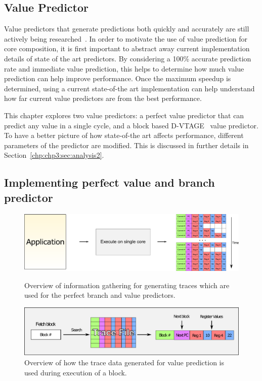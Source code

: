 \subsection{Value Predictor}

Value predictors that generate predictions both quickly and accurately are still actively being researched~\cite{peraisVTAGE2014,peraisBeBop2015,sheikh2017value}.
In order to motivate the use of value prediction for core composition, it is first important to abstract away current implementation details of state of the art predictors.
By considering a 100\% accurate prediction rate and immediate value prediction, this helps to determine how much value prediction can help improve performance.
Once the maximum speedup is determined, using a current state-of-the art implementation can help understand how far current value predictors are from the best performance.

This chapter explores two value predictors: a perfect value predictor that can predict any value in a single cycle, and a block based D-VTAGE~\cite{peraisBeBop2015} value predictor.
To have a better picture of how state-of-the art affects performance, different parameters of the predictor are modified.
This is discussed in further details in Section~\ref{chp:chp3:sec:analysis2}.

\subsection{Implementing perfect value and branch predictor}

\begin{figure}[t]
    \centering
    \includegraphics[width=1\textwidth]{chapter3/graphics/trace-gen.pdf}

    \caption{Overview of information gathering for generating traces which are used for the perfect branch and value predictors.}
    \label{fig:trace-gen}
    \centering
    \includegraphics[width=1\textwidth]{chapter3/graphics/fetching-trace.pdf}

    \caption{Overview of how the trace data generated for value prediction is used during execution of a block.}
    \label{fig:trace-used}
	\vspace{1em}
\end{figure}

